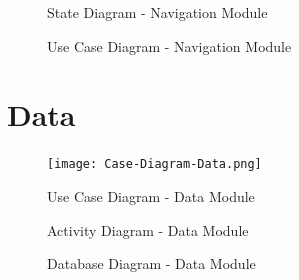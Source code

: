 \documentclass[english]{article}
\begin{document}
        \begin{figure}[H]
            \centering	            
            \centerline{}
            \caption{State Diagram - Navigation Module}
        \end{figure}

        \begin{figure}[H]
            \centering	            
            \centerline{}
            \caption{Use Case Diagram - Navigation Module}
        \end{figure}

    \section{Data}
        \begin{figure}[H]
            \centering	            
            \centerline{\texttt{[image: Case-Diagram-Data.png]}}
            \caption{Use Case Diagram - Data Module}
        \end{figure}

        \begin{figure}[H]
            \centering	            
            \centerline{}
            \caption{Activity Diagram - Data Module}

        \end{figure} 
        
        \begin{figure}[H]
            \centering	            
            \centerline{}
            \caption{Database Diagram - Data Module}
        \end{figure} 
        
\end{document}
